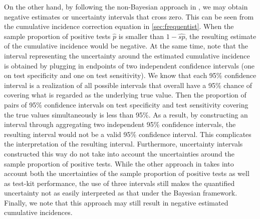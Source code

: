On the other hand, by following the non-Bayesian approach in \cite{meyer2022adjusting}, we may obtain negative estimates or uncertainty intervals that cross zero. This can be seen from the cumulative incidence correction equation in \cref{sec:frequentist}. When the sample proportion of positive tests $\hat{p}$ is smaller than $1-\hat{sp}$, the resulting estimate of the cumulative incidence would be negative. At the same time, note that the interval representing the uncertainty around the estimated cumulative incidence is obtained by plugging in endpoints of two independent confidence intervals (one on test specificity and one on test sensitivity). We know that each 95\% confidence interval is a realization of all possible intervals that overall have a 95\% chance of covering what is regarded as the underlying true value. Then the proportion of pairs of 95\% confidence intervals on test specificity and test sensitivity covering the true values simultaneously is less than 95\%. As a result, by constructing an interval through aggregating two independent 95\% confidence intervals, the resulting interval would not be a valid 95\% confidence interval. This complicates the interpretation of the resulting interval. Furthermore, uncertainty intervals constructed this way do not take into account the uncertainties around the sample proportion of positive tests. While the other approach in \cite{rosenberg2020cumulative} takes into account both the uncertainties of the sample proportion of positive tests as well as test-kit performance, the use of three intervals still makes the quantified uncertainty not as easily interpreted as that under the Bayesian framework. Finally, we note that this approach may still result in negative estimated cumulative incidences.

